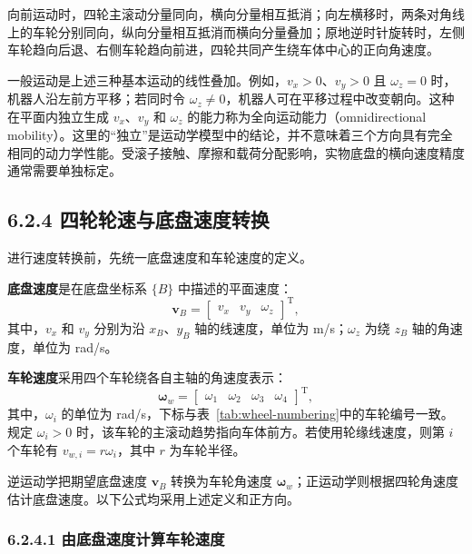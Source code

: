 \documentclass[UTF8,zihao=-4]{ctexart}
\newcommand{\vect}[1]{\bm{#1}}
\begin{document}
向前运动时，四轮主滚动分量同向，横向分量相互抵消；向左横移时，两条对角线上的车轮分别同向，纵向分量相互抵消而横向分量叠加；原地逆时针旋转时，左侧车轮趋向后退、右侧车轮趋向前进，四轮共同产生绕车体中心的正向角速度。

一般运动是上述三种基本运动的线性叠加。例如，$v_x>0$、$v_y>0$ 且 $\omega_z=0$ 时，机器人沿左前方平移；若同时令 $\omega_z\neq0$，机器人可在平移过程中改变朝向。这种在平面内独立生成 $v_x$、$v_y$ 和 $\omega_z$ 的能力称为全向运动能力（omnidirectional mobility）。这里的“独立”是运动学模型中的结论，并不意味着三个方向具有完全相同的动力学性能。受滚子接触、摩擦和载荷分配影响，实物底盘的横向速度精度通常需要单独标定。

\subsection*{6.2.4 四轮轮速与底盘速度转换}

进行速度转换前，先统一底盘速度和车轮速度的定义。

\textbf{底盘速度}是在底盘坐标系 $\{B\}$ 中描述的平面速度：
\begin{equation}
  \vect{v}_B=
  \begin{bmatrix}
    v_x & v_y & \omega_z
  \end{bmatrix}^{\mathrm T},
  \label{eq:body-velocity-definition}
\end{equation}
其中，$v_x$ 和 $v_y$ 分别为沿 $x_B$、$y_B$ 轴的线速度，单位为 \si{m/s}；$\omega_z$ 为绕 $z_B$ 轴的角速度，单位为 \si{rad/s}。

\textbf{车轮速度}采用四个车轮绕各自主轴的角速度表示：
\begin{equation}
  \vect{\omega}_w=
  \begin{bmatrix}
    \omega_1 & \omega_2 & \omega_3 & \omega_4
  \end{bmatrix}^{\mathrm T},
  \label{eq:wheel-velocity-definition}
\end{equation}
其中，$\omega_i$ 的单位为 \si{rad/s}，下标与表~\ref{tab:wheel-numbering}中的车轮编号一致。规定 $\omega_i>0$ 时，该车轮的主滚动趋势指向车体前方。若使用轮缘线速度，则第 $i$ 个车轮有 $v_{w,i}=r\omega_i$，其中 $r$ 为车轮半径。

逆运动学把期望底盘速度 $\vect{v}_B$ 转换为车轮角速度 $\vect{\omega}_w$；正运动学则根据四轮角速度估计底盘速度。以下公式均采用上述定义和正方向。

\subsubsection*{6.2.4.1 由底盘速度计算车轮速度}
\end{document}
